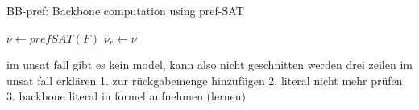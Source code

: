 \begin{algorithm}
\caption{{\sc BB-pref: Backbone computation using pref-SAT}}
\DontPrintSemicolon
{}

$\nu \gets prefSAT(F)$\;
$\nu_r \gets \nu $\;
\end{algorithm}



im unsat fall gibt es kein model, kann also nicht geschnitten werden
drei zeilen im unsat fall erklären
1. zur rückgabemenge hinzufügen
2. literal nicht mehr prüfen
3. backbone literal in formel aufnehmen (lernen)
